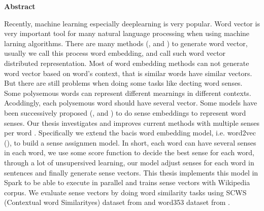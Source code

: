 \thispagestyle{empty}

\centerline{\Large{\textbf{Abstract}}}

\vspace{2cm}

\noindent Recently, machine learning especially deeplearning is very popular. Word vector is very important tool for many natural language processing when using machine larning algorithms.  There are many methods (\citep{BengioDucharmeEtAl2003},\citep{CollobertWeston2008} and \citep{MikolovSutskeverEtAl2013}) to generate word vector, usually we call this process word embedding, and call such word vector distributed representation. Most of word embedding methods can not generate word vector based on word's context, that is similar words have similar vectors. But there are still problems when doing some tasks like decting word senses. Some polysemous words can represent different mearnings in different contexts. Acoddingly, each polysemous word should have several vector. Some models have been successively proposed (\citep{HuangSocherEtAl2012},\citep{TianDaiEtAl2014} and \citep{NeelakantanShankarEtAl2015}) to do sense embeddings to represent word senses. Our thesis investigates and improves current methods with multiple senses per word . Specifically  we extend the bacis word embedding model, i.e. word2vec (\citep{MikolovSutskeverEtAl2013}), to build a sense assignmen model. In short, each word can have several senses in each word, we use some score function to decide the best sense for each word, through a lot of unsupersived learning, our model adjust senses for each word in sentences and finally generate sense vectors. This thesis implements this model in Spark to be able to execute in parallel and trains sense vectors with Wikipedia corpus. We evaluate sense vectors by doing word similarity tasks using SCWS (Contextual word Similarityes) dataset from \citep{HuangSocherEtAl2012} and word353 dataset from \citep{FinkelsteinGabrilovichEtAl2001} . 

\newpage
\thispagestyle{empty}
\rule{0cm}{5cm}